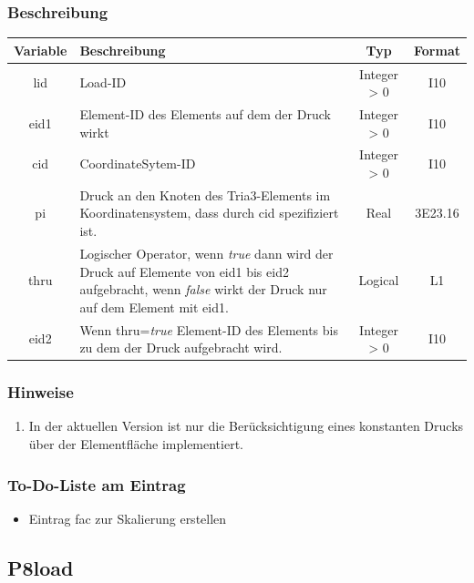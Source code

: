 \documentclass[11pt,titlepage,listof=totoc,bibliography=totoc,twoside]{scrreprt}
\begin{document}
{{\subsubsection{Beschreibung}

\begin{tabularx}{\textwidth}{cXcc}
\toprule
Variable& Beschreibung												& Typ			& Format\\
\midrule
lid	& Load-ID												& Integer > 0	& I10	\\
eid1	& Element-ID des Elements auf dem der Druck wirkt							& Integer > 0	& I10	\\
cid	& CoordinateSytem-ID											& Integer > 0	& I10	\\
pi	& Druck an den Knoten des Tria3-Elements im Koordinatensystem, dass durch cid spezifiziert ist.		& Real			& 3E23.16\\
thru	& Logischer Operator, wenn \emph{true} dann wird der Druck auf Elemente von eid1 bis eid2 aufgebracht, wenn \emph{false} wirkt der Druck nur auf dem Element mit eid1.																		& Logical	& L1	\\
eid2	& Wenn thru=\emph{true} Element-ID des Elements bis zu dem der Druck aufgebracht wird.			& Integer > 0	& I10	\\
\bottomrule
\end{tabularx}

\subsubsection{Hinweise}

\begin{enumerate}
\item In der aktuellen Version ist nur die Berücksichtigung eines konstanten Drucks über der Elementfläche implementiert.
\end{enumerate}

\subsubsection{To-Do-Liste am Eintrag}

\begin{itemize}
\item Eintrag fac zur Skalierung erstellen
\end{itemize}

\newpage

\subsection{P8load}

}}
\end{document}
